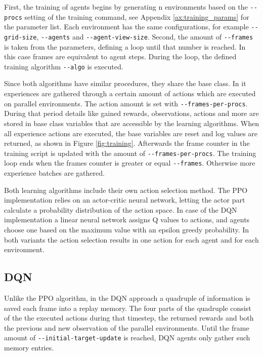 First, the training of agents begins by generating n environments based on the \verb|--procs| setting of the training command, see Appendix \ref{ax:training_params} for the parameter list. Each environment has the same configurations, for example \verb|--grid-size|, \verb|--agents| and \verb|--agent-view-size|. Second, the amount of \verb|--frames| is taken from the parameters, defining a loop until that number is reached. In this case frames are equivalent to agent steps. During the loop, the defined training algorithm \verb|--algo| is executed.

Since both algorithms have similar procedures, they share the base class. In it experiences are gathered through a certain amount of actions which are executed on parallel environments. The action amount is set with \verb|--frames-per-procs|. During that period details like gained rewards, observations, actions and more are stored in base class variables that are accessible by the learning algorithms. When all experience actions are executed, the base variables are reset and log values are returned, as shown in Figure \ref{fig:training}. Afterwards the frame counter in the training script is updated with the amount of \verb|--frames-per-procs|. The training loop ends when the frames counter is greater or equal \verb|--frames|. Otherwise more experience batches are gathered.

Both learning algorithms include their own action selection method. The PPO implementation relies on an actor-critic neural network, letting the actor part calculate a probability distribution of the action space. In case of the DQN implementation a linear neural network assigns Q values to actions, and agents choose one based on the maximum value with an epsilon greedy probability. In both variants the action selection results in one action for each agent and for each environment.

\subsection{DQN}
Unlike the PPO algorithm, in the DQN approach a quadruple of information is saved each frame into a replay memory. The four parts of the quadruple consist of the the executed actions during that timestep, the returned rewards and both the previous and new observation of the parallel environments. Until the frame amount of \verb|--initial-target-update| is reached, DQN agents only gather such memory entries.

